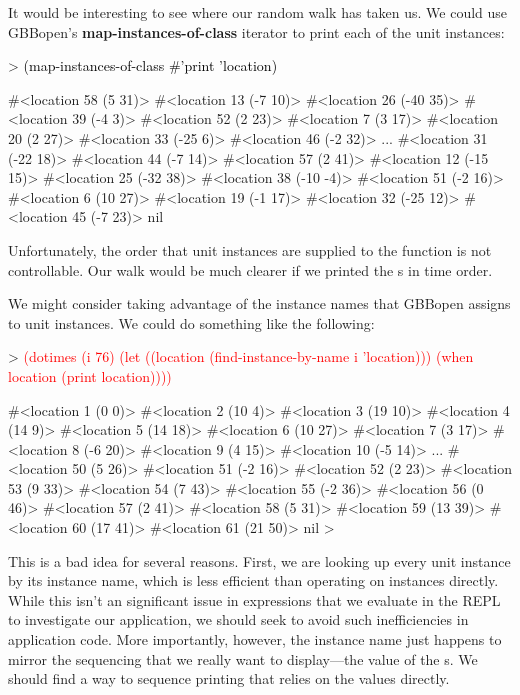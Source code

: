 \documentclass[10pt,twoside,english,pdftex]{article}
\begin{document}
%
It would be interesting to see where our random walk has taken us.  We could
use GBBopen's \textbf{map-instances-of-class} iterator to print each of the
 unit instances:
%
\begin{example}\color{darkergray}%
  > \textcolor{black}{(map-instances-of-class #'print 'location)}

  #<location 58 (5 31)> 
  #<location 13 (-7 10)> 
  #<location 26 (-40 35)> 
  #<location 39 (-4 3)> 
  #<location 52 (2 23)> 
  #<location 7 (3 17)> 
  #<location 20 (2 27)> 
  #<location 33 (-25 6)> 
  #<location 46 (-2 32)> 
       ...
  #<location 31 (-22 18)> 
  #<location 44 (-7 14)> 
  #<location 57 (2 41)> 
  #<location 12 (-15 15)> 
  #<location 25 (-32 38)> 
  #<location 38 (-10 -4)> 
  #<location 51 (-2 16)> 
  #<location 6 (10 27)> 
  #<location 19 (-1 17)> 
  #<location 32 (-25 12)> 
  #<location 45 (-7 23)> 
  nil
\end{example}
%
Unfortunately, the order that unit instances are supplied to the 
function is not controllable.  Our walk would be much clearer if we printed
the s in time order.

%
We might consider taking advantage of the instance names that GBBopen assigns
to unit instances.  We could do something like the following:
%
\begin{example}\color{darkergray}%
  > \textcolor{red}{(dotimes (i 76)
      (let ((location (find-instance-by-name i 'location)))
        (when location
           (print location))))}

  #<location 1 (0 0)> 
  #<location 2 (10 4)> 
  #<location 3 (19 10)> 
  #<location 4 (14 9)> 
  #<location 5 (14 18)> 
  #<location 6 (10 27)> 
  #<location 7 (3 17)> 
  #<location 8 (-6 20)> 
  #<location 9 (4 15)> 
  #<location 10 (-5 14)> 
       ...
  #<location 50 (5 26)> 
  #<location 51 (-2 16)> 
  #<location 52 (2 23)> 
  #<location 53 (9 33)> 
  #<location 54 (7 43)> 
  #<location 55 (-2 36)> 
  #<location 56 (0 46)> 
  #<location 57 (2 41)> 
  #<location 58 (5 31)> 
  #<location 59 (13 39)> 
  #<location 60 (17 41)> 
  #<location 61 (21 50)> 
  nil
  >
\end{example}

This is a bad idea for several reasons.  First, we are looking up every
 unit instance by its instance name, which is less efficient
than operating on  instances directly.  While this isn't an
significant issue in expressions that we evaluate in the REPL to investigate
our application, we should seek to avoid such inefficiencies in application
code.  More importantly, however, the  instance name just
happens to mirror the sequencing that we really want to display---the
 value of the s.  We should find a way to sequence
 printing that relies on the  values directly.
\end{document}
